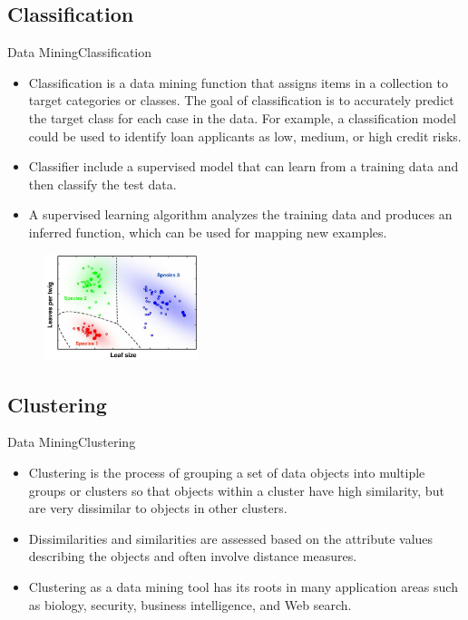 \documentclass[10pt]{beamer}
\begin{document}
\subsection{Classification}
\begin{frame}{Data Mining}{Classification}
\begin{itemize}
\item Classification is a data mining function that assigns items in a collection to target categories or classes. The goal of classification is to accurately predict the target class for each case in the data. For example, a classification model could be used to identify loan applicants as low, medium, or high credit risks.

\item Classifier include a supervised model that can learn from a training data and then classify the test data.

\item A supervised learning algorithm analyzes the training data and produces an inferred function, which can be used for mapping new examples.

\end{itemize}
\begin{figure}[H]
	\centering
	\includegraphics[width=0.4\textwidth]{images/Classification.jpg}
 
\end{figure}

\end{frame}
\subsection{Clustering}
\begin{frame}{Data Mining}{Clustering}

\begin{itemize}
\item Clustering is the process of grouping a set of data objects into multiple groups or clusters
so that objects within a cluster have high similarity, but are very dissimilar to objects in
other clusters.
\item Dissimilarities and similarities are assessed based on the attribute values describing the
objects and often involve distance measures.
\item Clustering as a data mining tool has its roots in many application areas such as biology,
security, business intelligence, and Web search.
\end{itemize}

\end{frame}
\end{document}
